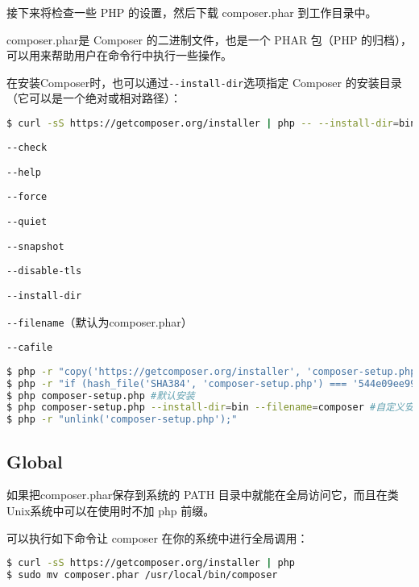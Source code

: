 接下来将检查一些 PHP 的设置，然后下载 composer.phar 到工作目录中。

composer.phar是 Composer 的二进制文件，也是一个 PHAR 包（PHP 的归档），可以用来帮助用户在命令行中执行一些操作。

在安装Composer时，也可以通过\texttt{-\/-install-dir}选项指定 Composer 的安装目录（它可以是一个绝对或相对路径）：

\begin{lstlisting}[language=bash]
$ curl -sS https://getcomposer.org/installer | php -- --install-dir=bin
\end{lstlisting}

\begin{compactitem}
\item \texttt{-\/-check}
\item \texttt{-\/-help}
\item \texttt{-\/-force}
\item \texttt{-\/-quiet}
\item \texttt{-\/-snapshot}
\item \texttt{-\/-disable-tls}
\item \texttt{-\/-install-dir}
\item \texttt{-\/-filename}（默认为composer.phar）
\item \texttt{-\/-cafile}
\end{compactitem}

\begin{lstlisting}[language=bash]
$ php -r "copy('https://getcomposer.org/installer', 'composer-setup.php');"
$ php -r "if (hash_file('SHA384', 'composer-setup.php') === '544e09ee996cdf60ece3804abc52599c22b1f40f4323403c44d44fdfdd586475ca9813a858088ffbc1f233e9b180f061') { echo 'Installer verified'; } else { echo 'Installer corrupt'; unlink('composer-setup.php'); } echo PHP_EOL;"
$ php composer-setup.php #默认安装
$ php composer-setup.php --install-dir=bin --filename=composer #自定义安装
$ php -r "unlink('composer-setup.php');"
\end{lstlisting}


\subsection{Global}

如果把composer.phar保存到系统的 PATH 目录中就能在全局访问它，而且在类Unix系统中可以在使用时不加 php 前缀。

可以执行如下命令让 composer 在你的系统中进行全局调用：

\begin{lstlisting}[language=bash]
$ curl -sS https://getcomposer.org/installer | php
$ sudo mv composer.phar /usr/local/bin/composer
\end{lstlisting}

